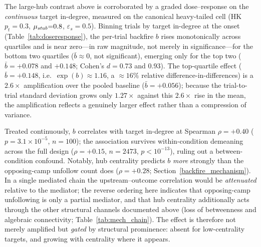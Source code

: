 \documentclass[pdflatex,sn-mathphys-num]{sn-jnl}%
\theoremstyle{thmstyleone}%
\theoremstyle{thmstyletwo}%
\theoremstyle{thmstylethree}%
\def\Stubbornness{\mu_{\it stub}}
\def\ThofOpPreval{\varepsilon_s}
\begin{document}
The large-hub contrast above is corroborated by a graded dose--response on the
\emph{continuous} target in-degree, measured on the canonical heavy-tailed cell
(HK $p_t{=}0.3$, $\Stubbornness{=}0.8$, $\ThofOpPreval{=}0.5$). Binning trials by
target in-degree at the onset (Table~\ref{tab:doseresponse}), the per-trial
backfire $b$ rises monotonically across quartiles and is near zero---in raw
magnitude, not merely in significance---for the bottom two quartiles
($\bar b \approx 0$, not significant), emerging only for the top two
($\bar b = +0.078$ and $+0.148$; Cohen's $d = 0.73$ and $0.93$). The top-quartile
effect ($\bar b = +0.148$, i.e.\ $\exp(b) \approx 1.16$, a $\approx 16\%$ relative
difference-in-differences) is a $2.6\times$ amplification over the pooled baseline
($\bar b = +0.056$); because the trial-to-trial standard deviation grows only
$1.27\times$ against this $2.6\times$ rise in the mean, the amplification reflects
a genuinely larger effect rather than a compression of variance.
\par

Treated continuously, $b$ correlates with target in-degree at Spearman
$\rho = +0.40$ ($p = 3.1\times10^{-5}$, $n = 100$); the association survives
within-condition demeaning across the full design ($\rho = +0.15$, $n = 2473$,
$p < 10^{-13}$), ruling out a between-condition confound. Notably, hub centrality
predicts $b$ \emph{more} strongly than the opposing-camp unfollow count does
($\rho = +0.28$; Section~\ref{backfire_mechanism}). In a single mediated chain the
upstream--outcome correlation would be \emph{attenuated} relative to the mediator;
the reverse ordering here indicates that opposing-camp unfollowing is only a
partial mediator, and that hub centrality additionally acts through the other
structural channels documented above (loss of betweenness and algebraic
connectivity; Table~\ref{tab:mech_chain}). The effect is therefore not merely
amplified but \emph{gated} by structural prominence: absent for low-centrality
targets, and growing with centrality where it appears.
\par
\end{document}
